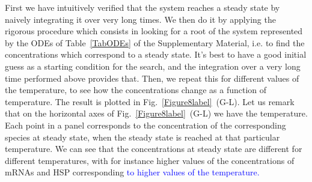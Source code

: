 \documentclass[oneside, 10pt, a4paper, twocolumn]{article}
\begin{document}
First we have intuitively verified that the system reaches a steady state by naively integrating it over very long times. %
We then do it by applying the rigorous procedure which consists in looking for a root of the system 
represented by the ODEs of Table~\ref{TabODEs} of the Supplementary Material, i.e. 
to find the concentrations which correspond to a steady state. 
It's best to have a good initial guess as a starting condition for the search, and the integration over a very long time performed above provides that. 
Then, we repeat this for different values of the temperature, to see how the concentrations change as a function of temperature. The result is plotted in Fig.~\ref{Figure8label}~(G-L). Let us remark that on the horizontal axes of Fig.~\ref{Figure8label}~(G-L) we have the temperature. Each point in a panel corresponds to the concentration of the corresponding species at steady state, when the steady state is reached at that particular temperature. 
We can see that the concentrations at steady state are different for different temperatures, with for instance higher values of the concentrations of mRNAs and HSP corresponding \textcolor{blue}{to higher values of the temperature.} 
\end{document}
